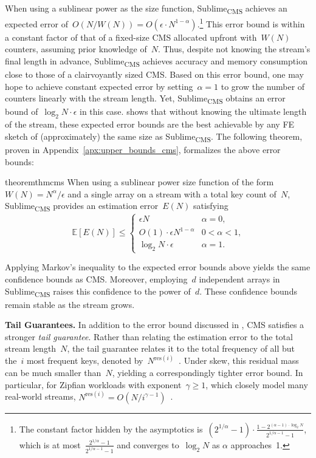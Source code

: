\documentclass[sigconf]{acmart}
\newcommand{\sketch}{Sublime}
\newcommand{\sketchcms}{\sketch\textsubscript{CMS}\xspace}
\newcommand{\expectation}[1]{\mathbb{E}\left[ #1 \right]}
\begin{document}
When using a sublinear power as the size function, \sketchcms achieves an expected error of~$O(N/W(N))=O(\epsilon \cdot N^{1-\alpha})$.\footnote{
    The constant factor hidden by the asymptotics is~$(2^{1/\alpha}-1) \cdot \frac{1-2^{(\alpha-1) \cdot \log_2 N}}{2^{1/\alpha-1}-1}$, which is at most~$\frac{2^{1/\alpha}-1}{2^{1/\alpha-1}-1}$ and converges to~$\log_2 N$ as $\alpha$ approaches~1.
}
This error bound is within a constant factor of that of a fixed-size CMS allocated upfront with~$W(N)$ counters, assuming prior knowledge of~$N$.
Thus, despite not knowing the stream's final length in advance, \sketchcms achieves accuracy and memory consumption close to those of a clairvoyantly sized CMS.
Based on this error bound, one may hope to achieve constant expected error by setting~$\alpha=1$ to grow the number of counters linearly with the stream length.
Yet, \sketchcms obtains an error bound of~$\log_2 N \cdot \epsilon$ in this case.
 shows that without knowing the ultimate length of the stream, these expected error bounds are the best achievable by any FE sketch of (approximately) the same size as \sketchcms. 
The following theorem, proven in Appendix~\ref{apx:upper_bounds_cms}, formalizes the above error bounds:
\begin{restatable}{theorem}{thmcms}
    \label{thm:cms-w}
    When using a sublinear power size function of the form~$W(N)=N^\alpha/\epsilon$ and a single array on a stream with a total key count of~$N$, \sketchcms provides an estimation error~$E(N)$ satisfying
    $$
    \expectation{E(N)} \leq  
    \begin{cases}
        \epsilon N & \text{$\alpha=0$,} \\
        O(1) \cdot \epsilon N^{1-\alpha} & \text{$0<\alpha<1$,} \\
        \log_2 N \cdot \epsilon & \text{$\alpha=1$.}
    \end{cases}
    $$
\end{restatable}
\noindent

Applying Markov's inequality to the expected error bounds above yields the same confidence bounds as CMS.
Moreover, employing~$d$ independent arrays in \sketchcms raises this confidence to the power of~$d$.
These confidence bounds remain stable as the stream grows.

\textbf{Tail Guarantees.}
In addition to the error bound discussed in , CMS satisfies a stronger \emph{tail guarantee}.
Rather than relating the estimation error to the total stream length~$N$, the tail guarantee relates it to the total frequency of all but the~$i$ most frequent keys, denoted by~$N^{\mathrm{res}(i)}$~\cite{CMSCSTail}.
Under skew, this residual mass can be much smaller than~$N$, yielding a correspondingly tighter error bound.
In particular, for Zipfian workloads with exponent~$\gamma \geq 1$, which closely model many real-world streams, $N^{\mathrm{res}(i)} = O(N/i^{\gamma-1})$~\cite{CMSCSTail}.
\end{document}

